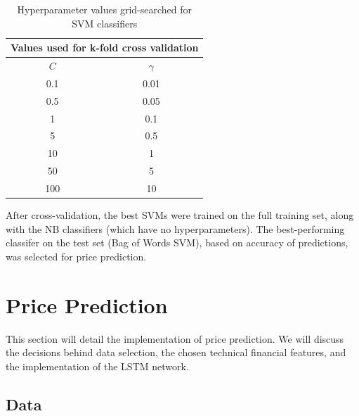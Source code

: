 \documentclass[12pt,a4paper,twoside,openright]{report}
\begin{document}
\begin{table}[H]
\centering
\vspace{10pt}
\setlength{\tabcolsep}{3cm}
\begin{tabular}{c c}
\toprule
\multicolumn{2}{c}{\textbf{Values used for k-fold cross validation}}                               \bigstrut\\
\midrule
$C$                                                                & $\gamma$   \bigstrut\\
\midrule
0.1                                                                  & 0.01                        \bigstrut\\
0.5                                                                  & 0.05                        \bigstrut\\ 
1                                                                    & 0.1                         \bigstrut\\ 
5                                                                    & 0.5                         \bigstrut\\
10                                                                   & 1                           \bigstrut\\
50                                                                   & 5                           \bigstrut\\
100                                                                  & 10                          \bigstrut\\ \bottomrule
\end{tabular}
\caption{Hyperparameter values grid-searched for SVM classifiers}
\label{table:SVMhyper}
\end{table}

After cross-validation, the best SVMs were trained on the full training set, 
along with the NB classifiers (which have no hyperparameters).
The best-performing classifer on the test set (Bag of Words SVM), based on accuracy of predictions,
was selected for price prediction.

\section{Price Prediction}
\label{sec:impFin}
This section will detail the implementation of price prediction. 
We will discuss the decisions behind data selection,
the chosen technical financial features, and the implementation
of the LSTM network.

\subsection{Data}
\label{sec:impFinData}
\end{document}
